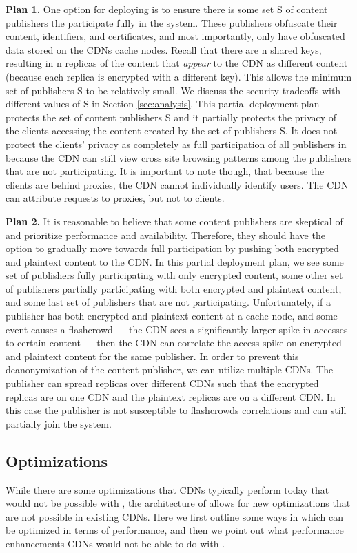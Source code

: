 {\bf Plan 1.}
One option for deploying \system{} is to ensure there is some set S of content publishers the participate fully in the 
system.  These publishers obfuscate their content, identifiers, and certificates, and most importantly, only have 
obfuscated data stored on the CDNs cache nodes.  Recall that there are n shared keys, resulting in n replicas of the 
content that {\it appear} to the CDN as different content (because each replica is encrypted with a different key).  This 
allows the minimum set of publishers S to be relatively small.  We discuss the security tradeoffs with different 
values of S in Section \ref{sec:analysis}.  This partial deployment plan protects the set of content publishers S and it 
partially protects the privacy of the clients accessing the content created by the set of publishers S.  It does not 
protect the clients' privacy as completely as full participation of all publishers in \system{} because the CDN can 
still view cross site browsing patterns among the publishers that are not participating. It is important to note though, that 
because the clients are behind proxies, the CDN cannot individually identify users.  The CDN can attribute requests to proxies, but 
not to clients.  

{\bf Plan 2.} 
It is reasonable to believe that some content publishers are skeptical of \system{} and prioritize performance 
and availability.  Therefore, they should have the option to gradually move towards full participation by pushing 
both encrypted and plaintext content to the CDN.  In this partial deployment plan, we see some set of publishers 
fully participating with only encrypted content, some other set of publishers partially participating with both 
encrypted and plaintext content, and some last set of publishers that are not participating.  Unfortunately, if 
a publisher has both encrypted and plaintext content at a cache node, and some event causes a flashcrowd --- 
the CDN sees a significantly larger spike in accesses to certain content --- then the CDN can correlate the access 
spike on encrypted and plaintext content for the same publisher.  In order to prevent this deanonymization of the 
content publisher, we can utilize multiple CDNs.  The publisher can spread replicas over different CDNs such that 
the encrypted replicas are on one CDN and the plaintext replicas are on a different CDN.  In this case the publisher 
is not susceptible to flashcrowds correlations and can still partially join the system.

\subsection{Optimizations}
While there are some optimizations that CDNs typically perform today that would not be possible with \system{}, the architecture 
of \system{} allows for new optimizations that are not possible in existing CDNs.  Here we first outline some ways in which \system{} 
can be optimized in terms of performance, and then we point out what performance enhancements CDNs would not be able to do with 
\system{}.

